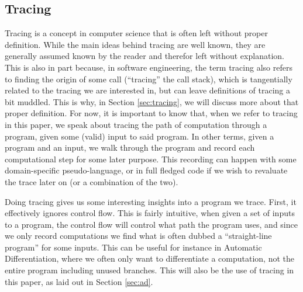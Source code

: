     \subsection{Tracing}
        Tracing is a concept in computer science that is often left without proper definition.
        While the main ideas behind tracing are well known, they are generally assumed known by the reader and therefor left without explanation.
        This is also in part because, in software engineering, the term tracing also refers to finding the origin of some call (``tracing'' the call stack), which is tangentially related to the tracing we are interested in, but can leave definitions of tracing a bit muddled.
        This is why, in Section \ref{sec:tracing}, we will discuss more about that proper definition.
        For now, it is important to know that, when we refer to tracing in this paper, we speak about tracing the path of computation through a program, given some (valid) input to said program.
        In other terms, given a program and an input, we walk through the program and record each computational step for some later purpose.
        This recording can happen with some domain-specific pseudo-language, or in full fledged code if we wish to revaluate the trace later on (or a combination of the two).

        Doing tracing gives us some interesting insights into a program we trace.
        First, it effectively ignores control flow.
        This is fairly intuitive, when given a set of inputs to a program, the control flow will control what path the program uses, and since we only record computations we find what is often dubbed a ``straight-line program'' for some inputs.
        This can be useful for instance in Automatic Differentiation, where we often only want to differentiate a computation, not the entire program including unused branches.
        This will also be the use of tracing in this paper, as laid out in Section \ref{sec:ad}.

